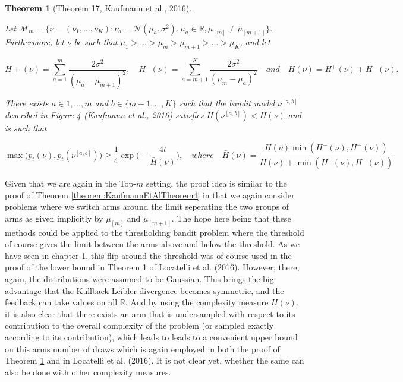 \documentclass[12pt,]{article}
\newtheorem{theorem}{Theorem}
\begin{document}
\begin{theorem}[Theorem 17, Kaufmann et al., 2016] \label{theorem:KaufmannEtAlTheorem17}

Let $\mathcal{M}_m = \{\nu = (\nu_1, \dots, \nu_K): \nu_a = \mathcal{N}(\mu_a, \sigma^2), \mu_a \in \mathbb{R}, \mu_{[m]}\neq \mu_{[m+1]}\}.$ Furthermore, let $\nu$ be such that $\mu_1 > \dots > \mu_m > \mu_{m+1} > \dots > \mu_K$, and let

\begin{equation*}
H +(\nu) = \sum_{a=1}^m \frac{2\sigma^2}{(\mu_a - \mu_{m+1})^2}, \quad H^-(\nu) = \sum_{a=m+1}^K \frac{2\sigma^2}{(\mu_m - \mu_a)^2} \quad
and \quad
H(\nu) = H^+(\nu) + H^-(\nu).
\end{equation*}

There exists $a \in {1, \dots, m}$ and $b \in \{m+1, \dots, K\}$ such that the bandit model $\nu^{[a,b]}$ described in Figure 4 (Kaufmann et al., 2016) satisfies $H(\nu^{[a,b]}) < H(\nu)$ and is such that

\begin{equation*}
\max \big( p_t(\nu),p_t(\nu^{[a,b]})\big) \geq \frac{1}{4} \exp \big(-\frac{4t}{\bar{H}(\nu)}\big), \quad where \quad \bar{H}(\nu) = \frac{H(\nu) \min(H^+(\nu),H^-(\nu))}{H(\nu)+\min(H^+(\nu),H^-(\nu))}
\end{equation*}
\end{theorem}

Given that we are again in the Top-\(m\) setting, the proof idea is
similar to the proof of Theorem \ref{theorem:KaufmannEtAlTheorem4} in
that we again consider problems where we switch arms around the limit
seperating the two groups of arms as given implicitly by \(\mu_{[m]}\)
and \(\mu_{[m+1]}\). The hope here being that these methods could be
applied to the thresholding bandit problem where the threshold of course
gives the limit between the arms above and below the threshold. As we
have seen in chapter 1, this flip around the threshold was of course
used in the proof of the lower bound in Theorem 1 of Locatelli et al.
(2016). However, there, again, the distributions were assumed to be
Gaussian. This brings the big advantage that the Kullback-Leibler
divergence becomes symmetric, and the feedback can take values on all
\(\mathbb{R}\). And by using the complexity measure \(H(\nu)\), it is
also clear that there exists an arm that is undersampled with respect to
its contribution to the overall complexity of the problem (or sampled
exactly according to its contribution), which leads to leads to a
convenient upper bound on this arms number of draws which is again
employed in both the proof of Theorem
\ref{theorem:KaufmannEtAlTheorem17} and in Locatelli et al. (2016). It
is not clear yet, whether the same can also be done with other
complexity measures.
\end{document}
